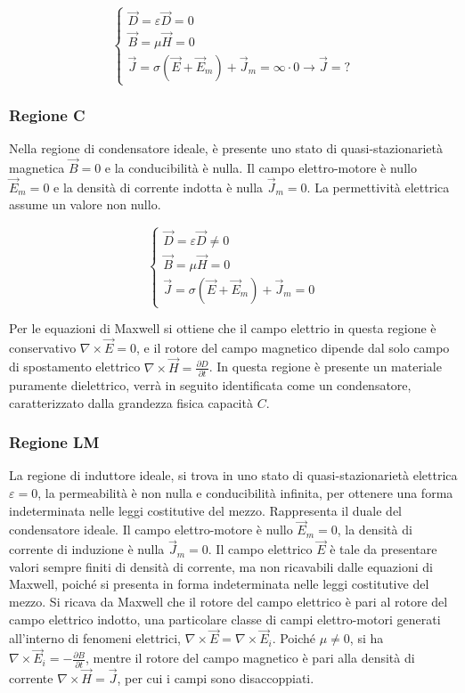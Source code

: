 \documentclass{article}
\numberwithin{equation}{subsection}
\begin{document}
\begin{equation*}
    \begin{cases}
        \vec{D}=\varepsilon\vec{D}=0\\
        \vec{B}=\mu\vec{H}=0\\
        \vec{J}=\sigma(\vec{E}+\vec{E}_m)+\vec{J}_m=\infty\cdot0\to\vec{J}=?
    \end{cases}
\end{equation*}

\subsubsection{Regione C}

Nella regione di condensatore ideale, è presente uno stato di quasi-stazionarietà magnetica $\vec{B}=0$ e la conducibilità è nulla. Il campo elettro-motore è nullo $\vec{E}_m=0$ 
e la densità di corrente indotta è nulla $\vec{J}_m=0$. La permettività elettrica assume un valore non nullo. 

\begin{equation*}
    \begin{cases}
        \vec{D}=\varepsilon\vec{D}\neq0\\
        \vec{B}=\mu\vec{H}=0\\
        \vec{J}=\sigma(\vec{E}+\vec{E}_m)+\vec{J}_m=0
    \end{cases}
\end{equation*}

Per le equazioni di Maxwell si ottiene che il campo elettrio in questa regione è conservativo $\nabla\times\vec{E}=0$, e il rotore del campo magnetico dipende dal solo campo 
di spostamento elettrico $\nabla\times\vec{H}=\displaystyle\frac{\partial D}{\partial t}$. In questa regione è presente un materiale puramente dielettrico, verrà in seguito 
identificata come un condensatore, caratterizzato dalla grandezza fisica capacità $C$.

\subsubsection{Regione LM}

La regione di induttore ideale, si trova in uno stato di quasi-stazionarietà elettrica $\varepsilon=0$, la permeabilità è non nulla e conducibilità infinita, per 
ottenere una forma indeterminata nelle leggi costitutive del mezzo. Rappresenta 
il duale del condensatore ideale. Il campo elettro-motore è nullo $\vec{E}_m=0$, la densità di corrente di induzione è nulla $\vec{J}_m=0$. Il campo elettrico $\vec{E}$ è tale 
da presentare valori sempre finiti di densità di corrente, ma non ricavabili dalle equazioni di Maxwell, poiché si presenta in forma indeterminata nelle leggi costitutive del mezzo. 
Si ricava da Maxwell che il rotore del campo elettrico è pari al rotore del campo elettrico indotto, una particolare classe di campi elettro-motori generati all'interno di 
fenomeni elettrici, $\nabla\times\vec{E}=\nabla\times\vec{E}_i$. 
Poiché $\mu\neq0$, si ha $\nabla\times\vec{E}_i=\displaystyle-\frac{\partial B}{\partial t}$, mentre il rotore del campo magnetico è pari alla densità di corrente 
$\nabla\times\vec{H}=\vec{J}$, per cui i campi sono disaccoppiati. 
\end{document}
